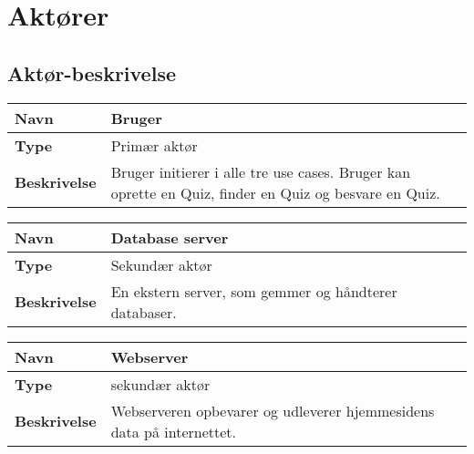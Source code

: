 \section{Aktører}




\subsection{Aktør-beskrivelse}

\begin{tabular}{|p{2cm}|p{12cm}|}

\hline 
\textbf{Navn} & Bruger \\ 
\hline 
\textbf{Type} & Primær aktør \\ 
\hline 
\textbf{Beskrivelse} & Bruger initierer i alle tre use cases. Bruger kan oprette en Quiz, finder en Quiz og besvare en Quiz.\\ 
\hline 

\end{tabular} 

\begin{tabular}{|p{2cm}|p{12cm}|}

\hline 
\textbf{Navn} & Database server \\ 
\hline 
\textbf{Type} & Sekundær aktør \\ 
\hline 
\textbf{Beskrivelse} & En ekstern server, som gemmer og håndterer databaser.\\ 
\hline 

\end{tabular} 

\begin{tabular}{|p{2cm}|p{12cm}|}

\hline 
\textbf{Navn} & Webserver \\ 
\hline 
\textbf{Type} & sekundær aktør \\ 
\hline 
\textbf{Beskrivelse} & Webserveren opbevarer og udleverer hjemmesidens data på internettet.\\ 
\hline 

\end{tabular} 